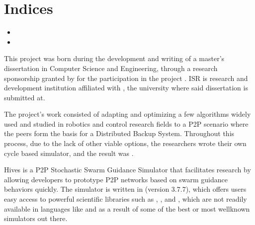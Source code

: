 \documentclass[letterpaper,10pt,english]{sphinxmanual}
\begin{document}
\chapter{Indices}
\label{\detokenize{indices:indices}}\label{\detokenize{indices::doc}}\begin{itemize}
\item {} 

\item {} 

\end{itemize}

This project was born during the development and writing of a master’s
dissertation in Computer Science and Engineering, through a research
sponsorship granted by  for the participation in the project
. ISR is research and
development institution affiliated with , the university where said
dissertation is submitted at.

The project’s work consisted of adapting and optimizing a few algorithms widely
used and studied in robotics and control research fields to a P2P scenario
where the peers form the basis for a Distributed Backup System. Throughout this
process, due to the lack of other viable options, the researchers wrote their
own cycle based simulator, and the result was .

Hives is a P2P Stochastic Swarm Guidance Simulator that facilitates
research by allowing developers to prototype P2P networks based on swarm
guidance behaviors quickly. The simulator is written in  (version 3.7.7),
which offers users easy access to powerful scientific libraries such as ,
, and , which are not readily available in languages like 
and as a result of some of the best or most well\sphinxhyphen{}known simulators out there.

 
\end{document}
